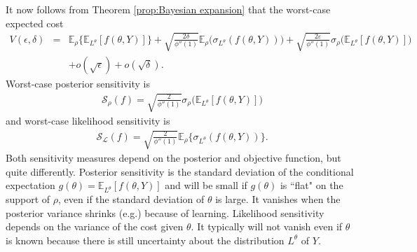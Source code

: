 \documentclass[10pt,a4paper]{amsart}
\numberwithin{equation}{section}
\numberwithin{theorem}{section}
\numberwithin{table}{section}
\numberwithin{figure}{section}
\begin{document}
It now  follows from Theorem \ref{prop:Bayesian expansion} that the worst-case expected cost 
\begin{eqnarray*}
V(\epsilon, \delta) %
& = &  {\mathbb E}_\rho\Big\{{\mathbb E}_{L^\theta}[f(\theta, Y)]\Big\}+ \sqrt{\frac{2\delta}{\phi''(1)}}{\mathbb E}_\rho \Big({\sigma}_{L^\theta}(f(\theta, Y))\Big) + \sqrt{\frac{2\varepsilon}{\phi''(1)}}
{\sigma}_\rho\Big({\mathbb E}_{L^\theta}[f(\theta, Y)]\Big) \nonumber \\
& & + o(\sqrt{\epsilon}) + o(\sqrt{\delta}).
\end{eqnarray*}
Worst-case posterior  sensitivity is
\begin{eqnarray}
{\mathcal S}_\rho(f) %
= \sqrt{\frac{2}{\phi''(1)}}{\sigma}_\rho\Big({\mathbb E}_{L^\theta}[f(\theta, Y)]\Big)
\label{eq:prior-sensitivity-const}
\end{eqnarray}
and worst-case likelihood sensitivity is %
\begin{eqnarray}
{\mathcal S}_{\mathcal L}(f) %
= \sqrt{\frac{2}{\phi''(1)}} {\mathbb E}_\rho \Big\{{\sigma}_{L^\theta}(f(\theta, Y))\Big\}.
\label{eq:likelihood-sensitivity-const}
\end{eqnarray}
Both sensitivity measures depend on the posterior and objective function, but quite differently. Posterior sensitivity  is the standard deviation of the conditional expectation $g(\theta) = {\mathbb E}_{L^\theta}[f(\theta, Y)]$ and will be small if $g(\theta)$ is ``flat" on the support of $\rho$, even if the standard deviation of $\theta$ is large. 
It vanishes when the posterior variance shrinks (e.g.) because of learning. Likelihood sensitivity depends on the variance of the cost given $\theta$. It typically will not vanish even if $\theta$ is known because there is still uncertainty about the distribution $L^\theta$ of $Y$.
\end{document}

